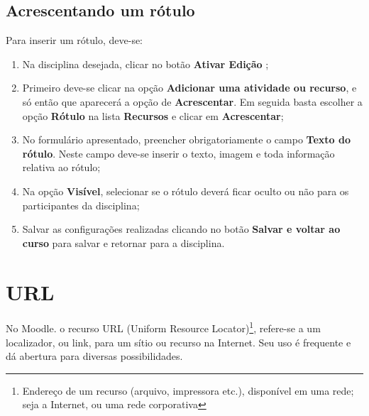 \subsection{Acrescentando um rótulo}
Para inserir um rótulo, deve-se:

\begin{enumerate}
\item Na disciplina desejada, clicar no botão \textbf{Ativar Edição} ;
\item Primeiro deve-se clicar na opção \textbf{Adicionar uma atividade ou recurso}, e só então que aparecerá a opção de \textbf{Acrescentar}. Em seguida basta escolher a opção \textbf{Rótulo} na lista \textbf{Recursos} e clicar em \textbf{Acrescentar};
\item No formulário apresentado, preencher obrigatoriamente o campo \textbf{Texto do rótulo}. Neste campo deve-se inserir o texto, imagem e toda informação relativa ao rótulo;
\item Na opção \textbf{Visível}, selecionar se o rótulo deverá ficar oculto ou não para os participantes da disciplina;
\item Salvar as configurações realizadas clicando no botão \textbf{Salvar e voltar ao curso} para salvar e retornar para a disciplina.
\end{enumerate}

\section{URL}

No Moodle. o recurso URL (Uniform Resource Locator)\footnote{Endereço de um recurso (arquivo, impressora etc.), disponível em uma rede; seja a Internet, ou uma rede corporativa}, refere-se a um localizador, ou link, para um sítio ou recurso na Internet. Seu uso é frequente e dá abertura para diversas possibilidades.

